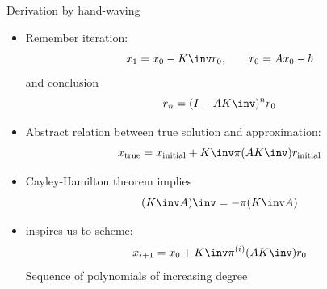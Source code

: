 \begin{longstory}
\end{longstory}


\begin{simplified}
  \begin{frame}{Derivation by hand-waving}
    \begin{itemize}
    \item Remember iteration:
      \[ x_1=x_0-K\inv r_0,\qquad r_0=Ax_0-b \]
      and conclusion
      \[ r_n=(I-AK\inv)^nr_0 \]
    \item Abstract relation between true solution and approximation:
      \[ x_{\mathrm{true}}
      =x_{\mathrm{initial}}+K\inv \pi(AK\inv)r_{\mathrm{initial}}
      \]
    \item Cayley-Hamilton theorem implies
      \[ (K\inv A)\inv=-\pi(K\inv A) \]
    \item inspires us to scheme:
      \[   x_{i+1} = x_0+K\inv \pi^{(i)}(AK\inv) r_0 \]
      Sequence of polynomials of increasing degree
    \end{itemize}
  \end{frame}
\end{simplified}

